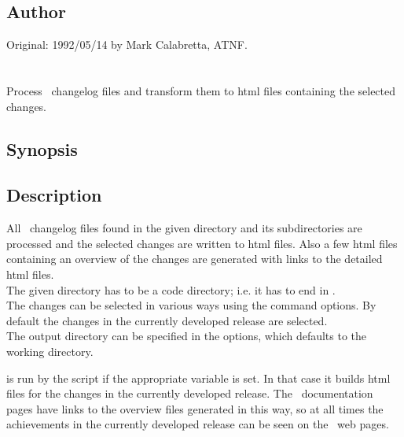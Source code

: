 \subsection*{Author}

Original: 1992/05/14 by Mark Calabretta, ATNF.


\newpage
\section{}
\label{buildchangelog}

Process \aipspp\ changelog files and transform them to
html files containing the selected changes.

\subsection*{Synopsis}

\begin{synopsis}
   \code{\exe{buildchangelog} [\exe{-dir[ectory]} directory]
     [\exe{-split[file]} area|package|module] [\textrm{select-options}
     <directory>}
\end{synopsis}

\subsection*{Description}

All \aipspp\ changelog files found in the given directory and its
subdirectories are processed and the selected changes
are written to html files. 
Also a few html files containing an overview of the changes are
generated with links to the detailed html files.
\\The given directory has to be a code directory; i.e. it has to
end in .
\\The changes can be selected in various ways using the command
options.
By default the changes in the currently developed release are
selected.
\\The output directory can be specified in the options, which defaults
to the working directory.

 is run by the  script if the
appropriate  variable is set.
In that case it builds html files for the changes in the currently
developed release.
The \aipspp\ documentation pages have links to the overview files
generated in this way, so at all times the achievements in the
currently developed release can be seen on the \aipspp\ web pages.

